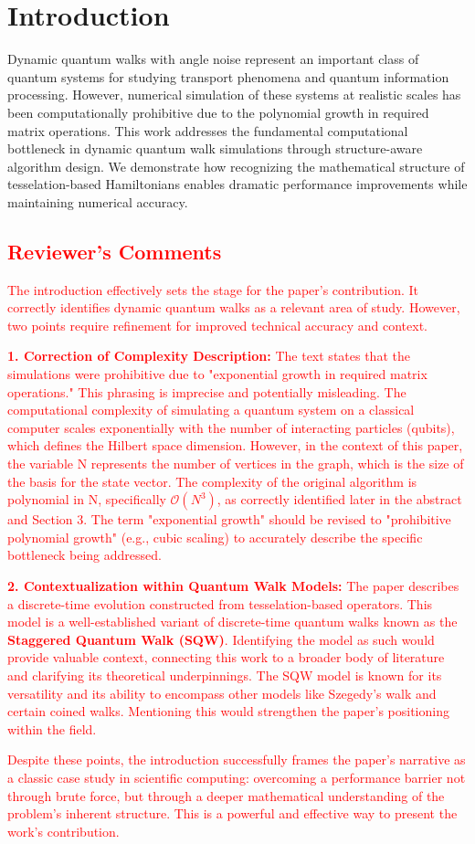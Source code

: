 \documentclass[11pt,a4paper]{article}
\newcommand{\bigO}{\mathcal{O}}
\begin{document}
\section{Introduction}

Dynamic quantum walks with angle noise represent an important class of quantum systems for studying transport phenomena and quantum information processing. However, numerical simulation of these systems at realistic scales has been computationally prohibitive due to the polynomial growth in required matrix operations. This work addresses the fundamental computational bottleneck in dynamic quantum walk simulations through structure-aware algorithm design. We demonstrate how recognizing the mathematical structure of tesselation-based Hamiltonians enables dramatic performance improvements while maintaining numerical accuracy.

\textcolor{red}{
\subsection*{Reviewer's Comments}
The introduction effectively sets the stage for the paper's contribution. It correctly identifies dynamic quantum walks as a relevant area of study. However, two points require refinement for improved technical accuracy and context.  

\textbf{1. Correction of Complexity Description:} The text states that the simulations were prohibitive due to "exponential growth in required matrix operations." This phrasing is imprecise and potentially misleading. The computational complexity of simulating a quantum system on a classical computer scales exponentially with the number of interacting particles (qubits), which defines the Hilbert space dimension. However, in the context of this paper, the variable N represents the number of vertices in the graph, which is the size of the basis for the state vector. The complexity of the original algorithm is polynomial in N, specifically $\bigO(N^3)$, as correctly identified later in the abstract and Section 3. The term "exponential growth" should be revised to "prohibitive polynomial growth" (e.g., cubic scaling) to accurately describe the specific bottleneck being addressed.

\textbf{2. Contextualization within Quantum Walk Models:} The paper describes a discrete-time evolution constructed from tesselation-based operators. This model is a well-established variant of discrete-time quantum walks known as the \textbf{Staggered Quantum Walk (SQW)}. Identifying the model as such would provide valuable context, connecting this work to a broader body of literature and clarifying its theoretical underpinnings. The SQW model is known for its versatility and its ability to encompass other models like Szegedy's walk and certain coined walks. Mentioning this would strengthen the paper's positioning within the field.

Despite these points, the introduction successfully frames the paper's narrative as a classic case study in scientific computing: overcoming a performance barrier not through brute force, but through a deeper mathematical understanding of the problem's inherent structure. This is a powerful and effective way to present the work's contribution.
}
\end{document}
